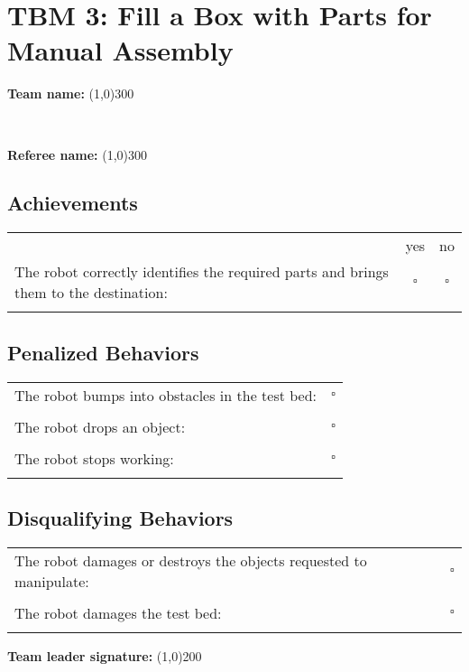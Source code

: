 \section*{TBM 3: Fill a Box with Parts for Manual Assembly}
\vspace{0.5cm} \begin{large} \textbf{Team name:} \line(1,0){300} \end{large} \vspace{0.7cm} \\ 
\vspace{0.5cm} \begin{large} \textbf{Referee name:} \line(1,0){300} \end{large} \vspace{0.2cm}

\subsection*{Achievements}
\begin{tabular}{ l c c}
 & yes & no \\
The robot correctly identifies the required parts and brings them to the destination: & $\square$ & $\square$\\ \\
\end{tabular}

\subsection*{Penalized Behaviors}
\begin{tabular}{ l c}
The robot bumps into obstacles in the test bed: & $\square$ \\ \\
The robot drops an object: & $\square$ \\ \\
The robot stops working: & $\square$ \\ \\


\end{tabular}

\subsection*{Disqualifying Behaviors}
\begin{tabular}{ l c}
The robot damages or destroys the objects requested to manipulate: & $\square$ \\ \\
The robot damages the test bed: & $\square$ \\ \\

\end{tabular}

\vspace{1.5cm}
\begin{large}
\textbf{Team leader signature:}
\line(1,0){200}
\end{large}